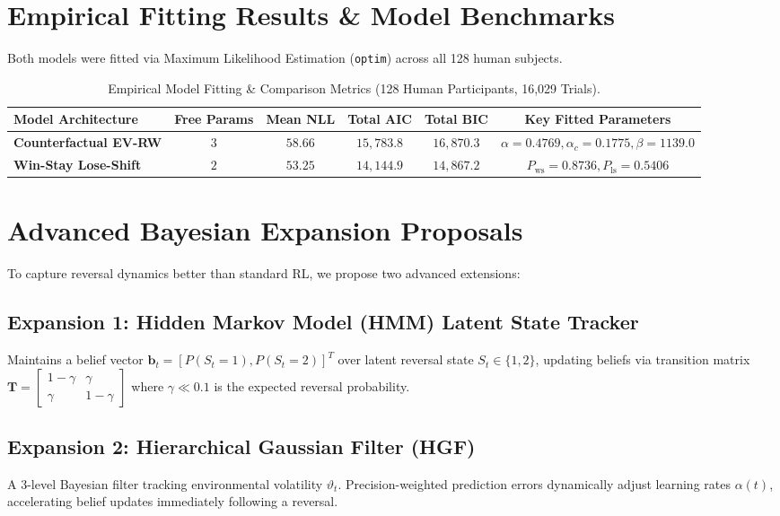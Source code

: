 \documentclass[11pt,a4paper]{article}
\begin{document}
\section{Empirical Fitting Results \& Model Benchmarks}

Both models were fitted via Maximum Likelihood Estimation (\texttt{optim}) across all 128 human subjects.

\begin{table}[H]
\centering
\caption{Empirical Model Fitting \& Comparison Metrics (128 Human Participants, 16,029 Trials).}
\label{tab:model_comp}
\vspace{0.5em}
\small
\begin{tabular}{l c c c c c}
\toprule
\textbf{Model Architecture} & \textbf{Free Params} & \textbf{Mean NLL} & \textbf{Total AIC} & \textbf{Total BIC} & \textbf{Key Fitted Parameters} \\
\midrule
\textbf{Counterfactual EV-RW} & $3$ & $58.66$ & $15,783.8$ & $16,870.3$ & $\alpha=0.4769, \alpha_c=0.1775, \beta=1139.0$ \\
\textbf{Win-Stay Lose-Shift} & $2$ & $53.25$ & $14,144.9$ & $14,867.2$ & $P_{\text{ws}}=0.8736, P_{\text{ls}}=0.5406$ \\
\bottomrule
\end{tabular}
\end{table}

\section{Advanced Bayesian Expansion Proposals}

To capture reversal dynamics better than standard RL, we propose two advanced extensions:

\subsection{Expansion 1: Hidden Markov Model (HMM) Latent State Tracker}
Maintains a belief vector $\mathbf{b}_t = [P(S_t = 1), P(S_t = 2)]^T$ over latent reversal state $S_t \in \{1, 2\}$, updating beliefs via transition matrix $\mathbf{T} = \begin{bmatrix} 1-\gamma & \gamma \\ \gamma & 1-\gamma \end{bmatrix}$ where $\gamma \ll 0.1$ is the expected reversal probability.

\subsection{Expansion 2: Hierarchical Gaussian Filter (HGF)}
A 3-level Bayesian filter tracking environmental volatility $\vartheta_t$. Precision-weighted prediction errors dynamically adjust learning rates $\alpha(t)$, accelerating belief updates immediately following a reversal.
\end{document}
